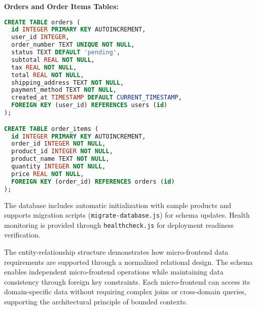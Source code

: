 \documentclass[12pt,a4paper]{report}
\begin{document}
\textbf{Orders and Order Items Tables:}
\begin{lstlisting}[language=SQL, caption=Order Management Schema]
CREATE TABLE orders (
  id INTEGER PRIMARY KEY AUTOINCREMENT,
  user_id INTEGER,
  order_number TEXT UNIQUE NOT NULL,
  status TEXT DEFAULT 'pending',
  subtotal REAL NOT NULL,
  tax REAL NOT NULL,
  total REAL NOT NULL,
  shipping_address TEXT NOT NULL,
  payment_method TEXT NOT NULL,
  created_at TIMESTAMP DEFAULT CURRENT_TIMESTAMP,
  FOREIGN KEY (user_id) REFERENCES users (id)
);

CREATE TABLE order_items (
  id INTEGER PRIMARY KEY AUTOINCREMENT,
  order_id INTEGER NOT NULL,
  product_id INTEGER NOT NULL,
  product_name TEXT NOT NULL,
  quantity INTEGER NOT NULL,
  price REAL NOT NULL,
  FOREIGN KEY (order_id) REFERENCES orders (id)
);
\end{lstlisting}

The database includes automatic initialization with sample products and supports migration scripts (\texttt{migrate-database.js}) for schema updates. Health monitoring is provided through \texttt{healthcheck.js} for deployment readiness verification.

The entity-relationship structure demonstrates how micro-frontend data requirements are supported through a normalized relational design. The schema enables independent micro-frontend operations while maintaining data consistency through foreign key constraints. Each micro-frontend can access its domain-specific data without requiring complex joins or cross-domain queries, supporting the architectural principle of bounded contexts.
\end{document}
